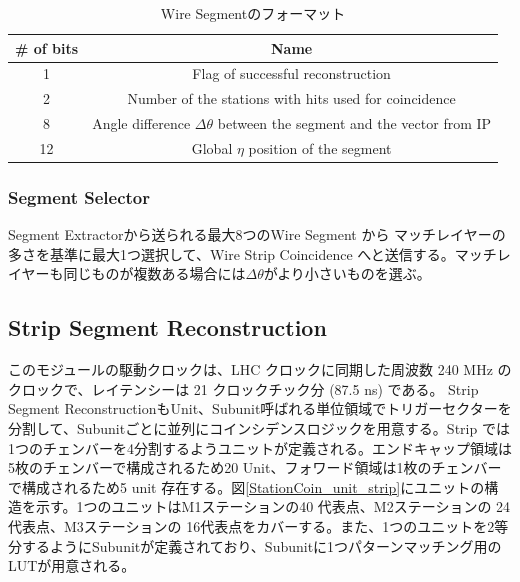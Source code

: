 \begin{table}[h]
    \centering
    \caption{Wire Segmentのフォーマット}
    \label{tab:WireSegment}
    \begin{tabular}{|c|c|}
    \hline
    \# of bits & Name                                                                       \\ \hline\hline
    1          & Flag of successful reconstruction                                          \\ \hline
    2          & Number of the stations with hits used for coincidence                      \\ \hline
    8          & Angle difference $\Delta\theta$ between the segment and the vector from IP \\ \hline
    12         & Global $\eta$ position of the segment                                      \\ \hline
    \end{tabular}
\end{table}

\subsubsection*{Segment Selector}
Segment Extractorから送られる最大8つのWire Segment から マッチレイヤーの多さを基準に最大1つ選択して、Wire Strip Coincidence へと送信する。マッチレイヤーも同じものが複数ある場合には$\Delta\theta$がより小さいものを選ぶ。

\subsection*{Strip Segment Reconstruction}
このモジュールの駆動クロックは、LHC クロックに同期した周波数 240 MHz のクロックで、レイテンシーは 21 クロックチック分 (87.5 ns) である。
Strip Segment ReconstructionもUnit、Subunit呼ばれる単位領域でトリガーセクターを分割して、Subunitごとに並列にコインシデンスロジックを用意する。Strip では 1つのチェンバーを4分割するようユニットが定義される。エンドキャップ領域は5枚のチェンバーで構成されるため20 Unit、フォワード領域は1枚のチェンバーで構成されるため5 unit 存在する。図\ref{StationCoin_unit_strip}にユニットの構造を示す。1つのユニットはM1ステーションの40 代表点、M2ステーションの 24代表点、M3ステーションの 16代表点をカバーする。また、1つのユニットを2等分するようにSubunitが定義されており、Subunitに1つパターンマッチング用のLUTが用意される。

